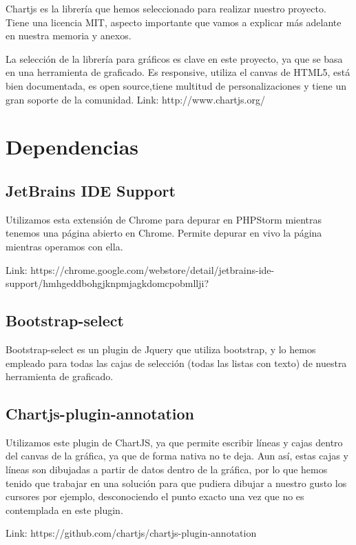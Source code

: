 Chartjs es la librería que hemos seleccionado para realizar nuestro proyecto. Tiene una licencia MIT, aspecto importante que vamos a explicar más adelante en nuestra memoria y anexos.\cite{ChartJS}

La selección de la librería para gráficos es clave en este proyecto, ya que se basa en una herramienta de graficado.
Es responsive, utiliza el canvas de HTML5, está bien documentada, es open source,tiene multitud de personalizaciones y tiene un gran soporte de la comunidad.
Link: http://www.chartjs.org/

\section{Dependencias}

\subsection{JetBrains IDE Support}

Utilizamos esta extensión de Chrome para depurar en PHPStorm mientras tenemos una página abierto en Chrome. Permite depurar en vivo la página mientras operamos con ella.

Link: https://chrome.google.com/webstore/detail/jetbrains-ide-support/hmhgeddbohgjknpmjagkdomcpobmllji?

\subsection{Bootstrap-select}
Bootstrap-select es un plugin de Jquery que utiliza bootstrap, y lo hemos empleado para todas las cajas de selección (todas las listas con texto) de nuestra herramienta de graficado.

 
\subsection{Chartjs-plugin-annotation}
Utilizamos este plugin de ChartJS, ya que permite escribir líneas y cajas dentro del canvas de la gráfica, ya que de forma nativa no te deja. Aun así, estas cajas y líneas son dibujadas a partir de datos dentro de la gráfica, por lo que hemos tenido que trabajar en una solución para que pudiera dibujar a nuestro gusto los cursores por ejemplo, desconociendo el punto exacto una vez que no es contemplada en este plugin.

Link: https://github.com/chartjs/chartjs-plugin-annotation



